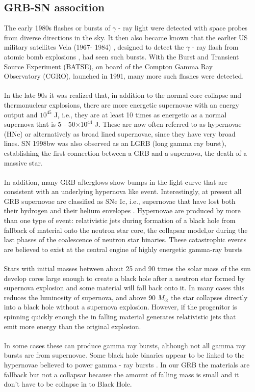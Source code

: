 \subsection{GRB-SN assocition}
The early 1980s flashes or bursts of $ \gamma $ - ray light were detected with space probes from diverse directions in the sky. It then also became known that the earlier US military satellites Vela (1967- 1984) , designed to detect the $ \gamma $ - ray flash from atomic bomb explosions , had seen such bursts. With the Burst and Transient Source Experiment (BATSE), on board of the Compton Gamma Ray Observatory (CGRO), launched in 1991, many more such flashes were detected.\citep{27}\\\\
 In the late 90s it was realized that, in addition to the  normal core collapse and thermonuclear explosions, there are more energetic supernovae  with an energy output and $ 10^{45} $  J, i.e., they are at least 10 times as energetic as a normal  supernova that is 5 - 50×$ 10^{44} $ J. These are now often referred to as hypernovae (HNe) or alternatively as broad lined supernovae, since they have very broad lines. SN 1998bw  was also observed as an LGRB (long gamma ray burst), establishing the first connection between a GRB and a supernova, the death of a massive star.         \citep{25}\citep{27}\\\\
In addition, many GRB afterglows show bumps in the light curve that are consistent with  an underlying hypernova like event. Interestingly, at present all GRB supernovae are classified as SNe Ic, i.e., supernovae that have lost both their hydrogen and their helium envelopes . Hypernovae are produced by more than one type of event: relativistic jets during formation  of a black hole from fallback of material onto the neutron star core, the collapsar model,or during the last phases of the coalescence of neutron star binaries. These catastrophic events are believed to exist at the central engine of highly energetic gamma-ray bursts \citep{28}\\\\
 Stars with initial masses between about 25 and 90 times the solar mass of the sun develop  cores large enough  to create a black hole  after a neutron  star formed by  supernova explosion  and some material will fall back onto it. In many cases this reduces the luminosity of  supernova, and above 90 $ M_{\odot} $ the star collapses directly into a black hole without a supernova explosion. However, if the progenitor is spinning quickly enough the in falling material generates relativistic jets that emit more energy than the original explosion.\\\\
 In some cases these can produce gamma ray bursts, although not all gamma ray bursts are from supernovae. Some black hole binaries appear to be linked to the hypernovae believed to power gamma - ray bursts .  In our GRB the materials are fallback but not a collapsar because the amount of falling mass is small and it don’t have to be collapse in to Black Hole.\citep{29}

